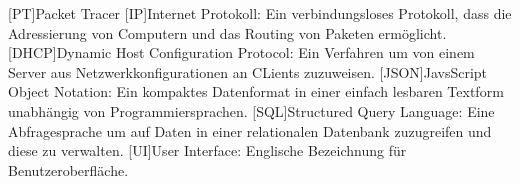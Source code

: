\begin{acronym}
	[PT]{Packet Tracer}
	[IP]{Internet Protokoll}: Ein verbindungsloses Protokoll, dass die Adressierung von Computern und das Routing von Paketen ermöglicht.
	[DHCP]{Dynamic Host Configuration Protocol}: Ein Verfahren um von einem Server aus Netzwerkkonfigurationen an CLients zuzuweisen.
	[JSON]{JavsScript Object Notation}:
	Ein kompaktes Datenformat in einer einfach lesbaren Textform unabhängig von Programmiersprachen.
	[SQL]{Structured Query Language}: Eine Abfragesprache um auf Daten in einer relationalen Datenbank zuzugreifen und diese zu verwalten.
	[UI]{User Interface}: Englische Bezeichnung für Benutzeroberfläche.
\end{acronym}